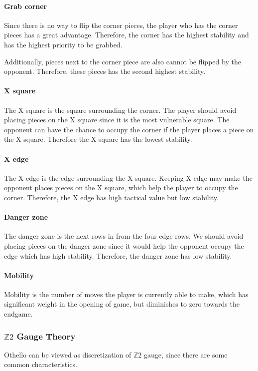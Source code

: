\documentclass[aps,pra,preprint,amsmath,amssymb,floatfix]{revtex4-2}
\begin{document}
\paragraph{Grab corner}
Since there is no way to flip the corner pieces, the player who has the corner pieces has a great advantage. Therefore, the corner has the highest stability and has the highest priority to be grabbed.

Additionally, pieces next to the corner piece are also cannot be flipped by the opponent. Therefore, these pieces has the second highest stability.
\par
\paragraph{X square}
The X square is the square surrounding the corner. The player should avoid placing pieces on the X square since it is the most vulnerable square. The opponent can have the chance to occupy the corner if the player places a piece on the X square. Therefore the X square has the lowest stability.
\par
\paragraph{X edge}
The X edge is the edge surrounding the X square. Keeping X edge may make the opponent places pieces on the X square, which help the player to occupy the corner. Therefore, the X edge has high tactical value but low stability.
\par
\paragraph{Danger zone} 
The danger zone is the next rows in from the four edge rows. We should avoid placing pieces on the danger zone since it would help the opponent occupy the edge which has high stability. Therefore, the danger zone has low stability.
\par 
\paragraph{Mobility}
Mobility is the number of moves the player is currently able to make, which has significant weight in the opening of game, but diminishes to zero towards the endgame.
\par

\subsubsection{$\mathbb{Z}2$ Gauge Theory}
Othello can be viewed as discretization of $\mathbb{Z}2$ gauge, since there are some common characteristics. 
\end{document}
